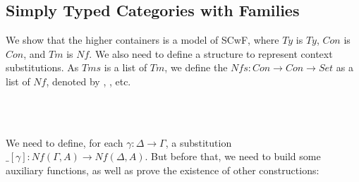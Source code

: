 \subsection{Simply Typed Categories with Families}

We show that the higher containers is a model of SCwF, where $Ty$ is $Ty$, $Con$ is $Con$, and $Tm$ is $Nf$. We also need to define a structure to represent context substitutions. As $Tms$ is a list of $Tm$, we define the $Nfs : Con \to Con \to Set$ as a list of $Nf$, denoted by \gamma, \delta, etc.

\begin{code}%
\>[0]\AgdaSpace{}%
\AgdaSpace{}%
\AgdaSymbol{:}\AgdaSpace{}%
\AgdaSpace{}%
\AgdaSpace{}%
\AgdaSpace{}%
\AgdaSpace{}%
\AgdaSpace{}%
\<%
\\
\>[0][@{}l@{\AgdaIndent{0}}]%
\>[2]%
\>[6]\AgdaSymbol{:}\AgdaSpace{}%
\AgdaSpace{}%
\AgdaSpace{}%
\<%
\\
%
\>[2]\AgdaOperator{\AgdaInductiveConstructor{\AgdaUnderscore{},\AgdaUnderscore{}}}\AgdaSpace{}%
\AgdaSymbol{:}\AgdaSpace{}%
\AgdaSpace{}%
\AgdaSpace{}%
\AgdaSpace{}%
\AgdaSpace{}%
\AgdaSpace{}%
\AgdaSpace{}%
\AgdaSpace{}%
\AgdaSpace{}%
\AgdaSpace{}%
\AgdaSpace{}%
\AgdaSymbol{(}\AgdaSpace{}%
\AgdaSpace{}%
\AgdaSymbol{)}\<%
\end{code}

\begin{code}[hide]%
\>[0]\AgdaSpace{}%
\AgdaSpace{}%
\AgdaSpace{}%
\AgdaSpace{}%
\AgdaSymbol{:}\AgdaSpace{}%
\AgdaSpace{}%
\AgdaSpace{}%
\<%
\end{code}

We need to define, for each $\gamma : \Delta \to \Gamma$, a substitution $\_[\gamma] : Nf(\Gamma,A) \to Nf(\Delta,A)$. But before that, we need to build some auxiliary functions, as well as prove the existence of other constructions:

